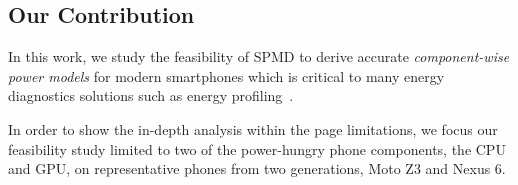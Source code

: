 \subsection{Our Contribution}
\label{subsec:contri}


In this work, we study the feasibility of SPMD to derive 
accurate {\it component-wise power models} for modern smartphones 
which is  critical to many energy diagnostics solutions such as energy profiling~\cite{flinn:1999,shye2009into,zhang2010accurate,sesame:2011,pathak2012energy,appscope,ding2017gfxdoctor,facebookbatterymetrics}.

In order to show the in-depth analysis within  the  page limitations, 
we focus our feasibility study limited to two of the power-hungry 
phone components, the CPU and GPU, on representative phones from two generations, Moto Z3 and Nexus 6. 

